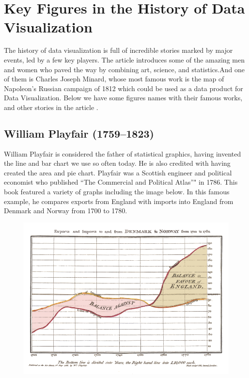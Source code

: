 \documentclass[]{book}
\theoremstyle{definition}
\theoremstyle{definition}
\theoremstyle{definition}
\theoremstyle{remark}
\begin{document}
\section{Key Figures in the History of Data
Visualization}\label{key-figures-in-the-history-of-data-visualization}

The history of data visualization is full of incredible stories marked
by major events, led by a few key players. The article
\citep{history_viz} introduces some of the amazing men and women who
paved the way by combining art, science, and statistics.And one of them
is Charles Joseph Minard, whose most famous work is the map of
Napoleon's Russian campaign of 1812 which could be used as a data
product for Data Visualization. Below we have some figures names with
their famous works, and other stories in the article
\citep{history_viz}.

\subsection{William Playfair
(1759--1823)}\label{william-playfair-17591823}

William Playfair is considered the father of statistical graphics,
having invented the line and bar chart we use so often today. He is also
credited with having created the area and pie chart. Playfair was a
Scottish engineer and political economist who published ``The Commercial
and Political Atlas''" in 1786. This book featured a variety of graphs
including the image below. In this famous example, he compares exports
from England with imports into England from Denmark and Norway from 1700
to 1780.

\begin{figure}
\centering
\includegraphics{images/Playfair.png}
\caption{}
\end{figure}
\end{document}
